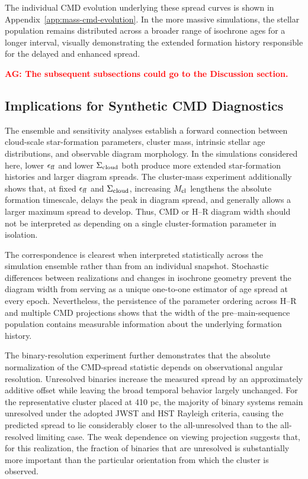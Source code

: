 \documentclass[linenumbers, twocolumn]{aastex631}
\begin{document}
The individual CMD evolution underlying these spread curves is shown in Appendix~\ref{app:mass-cmd-evolution}. In the more massive simulations, the stellar population remains distributed across a broader range of isochrone ages for a longer interval, visually demonstrating the extended formation history responsible for the delayed and enhanced spread.

\textbf{\textcolor{red}{AG: The subsequent subsections could go to the Discussion section.}}
\subsection{Implications for Synthetic CMD Diagnostics}

The ensemble and sensitivity analyses establish a forward connection between cloud-scale star-formation parameters, cluster mass, intrinsic stellar age distributions, and observable diagram morphology. In the simulations considered here, lower $\epsilon_{\rm ff}$ and lower $\Sigma_{\rm cloud}$ both produce more extended star-formation histories and larger diagram spreads. The cluster-mass experiment additionally shows that, at fixed $\epsilon_{\rm ff}$ and $\Sigma_{\rm cloud}$, increasing $M_{\rm cl}$ lengthens the absolute formation timescale, delays the peak in diagram spread, and generally allows a larger maximum spread to develop. Thus, CMD or H--R diagram width should not be interpreted as depending on a single cluster-formation parameter in isolation.

The correspondence is clearest when interpreted statistically across the simulation ensemble rather than from an individual snapshot. Stochastic differences between realizations and changes in isochrone geometry prevent the diagram width from serving as a unique one-to-one estimator of age spread at every epoch. Nevertheless, the persistence of the parameter ordering across H--R and multiple CMD projections shows that the width of the pre--main-sequence population contains measurable information about the underlying formation history.

The binary-resolution experiment further demonstrates that the absolute normalization of the CMD-spread statistic depends on observational angular resolution. Unresolved binaries increase the measured spread by an approximately additive offset while leaving the broad temporal behavior largely unchanged. For the representative cluster placed at 410 pc, the majority of binary systems remain unresolved under the adopted JWST and HST Rayleigh criteria, causing the predicted spread to lie considerably closer to the all-unresolved than to the all-resolved limiting case. The weak dependence on viewing projection suggests that, for this realization, the fraction of binaries that are unresolved is substantially more important than the particular orientation from which the cluster is observed.
\end{document}
